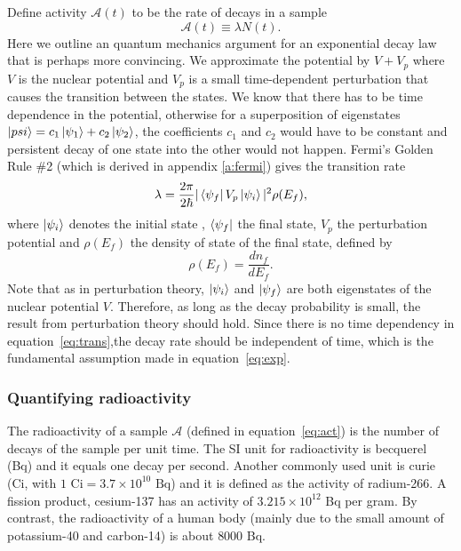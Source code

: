 \documentclass[preprint,aip,pra]{revtex4-1}
\begin{document}
        Define activity $\mathcal{A}(t)$ to be the rate of decays in a sample
        \begin{equation} \label{eq:act}
            \mathcal{A}(t)\equiv \lambda N(t).
        \end{equation}
        Here we outline an quantum mechanics argument for an exponential decay law that is perhaps more
        convincing.
        We approximate the potential by $V+V_p$ where $V$ is the nuclear potential and $V_p$ is a small
        time-dependent perturbation that causes the transition between the states. We know that there has
        to be time dependence in the potential, otherwise for a superposition of eigenstates
        $\ket{psi}=c_1\ket{\psi_1} + c_2\ket{\psi_2}$, the coefficients $c_1$ and $c_2$ would 
        have to be constant and
        persistent decay of one state into the other would not happen.
        Fermi's Golden Rule \#2 (which is derived in appendix \ref{a:fermi})
        gives the transition rate
        \begin{equation}
            \label{eq:trans}
            \lambda = \frac{2\pi}{2\hbar}|\bra{\psi_f}V_p\ket{\psi_i}|^2\rho(E_f),
        \end{equation}
        where $\ket{\psi_i}$ denotes the initial state , $\bra{\psi_f}$ the final state, $V_p$ the perturbation
        potential and $\rho(E_f)$ the density of state of the final state, defined by
        \begin{equation}
            \rho(E_f) = \frac{dn_f}{dE_f}.
        \end{equation}
        Note that as in perturbation theory, $\ket{\psi_i}$ and
        $\ket{\psi_f}$ are both eigenstates of the nuclear potential $V$. Therefore, as long as
        the decay probability is small, the result from perturbation theory should hold. Since
        there is no time dependency in equation~\ref{eq:trans},the
        decay rate should be independent of time, which is the fundamental assumption made in
        equation~\ref{eq:exp}.

        \subsubsection{Quantifying radioactivity}
        The radioactivity of a sample $\mathcal{A}$ (defined in equation~\ref{eq:act}) 
        is the number of decays of the sample per unit time. The SI
        unit for radioactivity is becquerel (Bq) and it equals one decay per second. Another commonly used
        unit is curie (Ci, with $1\text{ Ci}=3.7\times 10^{10}\text{ Bq}$) and it is defined as
        the activity of radium-266. A fission product, cesium-137 has an activity of $3.215\times 10^{12}$ Bq
        per gram. By contrast, the radioactivity of a human body (mainly due to the small amount of 
        potassium-40 and carbon-14) is about $8000$ Bq.
\end{document}
